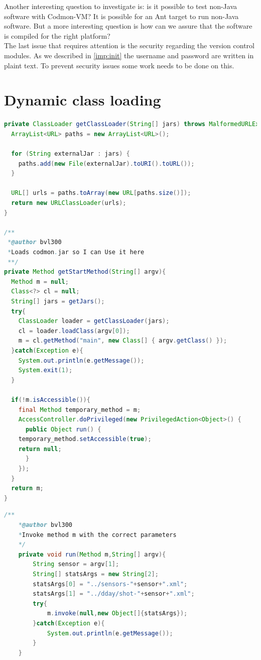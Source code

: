 \documentclass{article}
\newcommand{\project}{Codmon-VM}
\begin{document}
\noindent Another interesting question to investigate is: is it possible to test non-Java software with \project{}? It is possible for an Ant target to run non-Java software. But a more interesting 
question is how can we assure that the software is compiled for the right platform?\\

\noindent The last issue that requires attention is the security regarding the version control modules. As we described in \ref{imp:init} the username and password are written in plaint text. To prevent 
security issues some work needs to be done on this.

\newpage

\newpage
\appendix
\section{Dynamic class loading}
\label{AppendixA}

\begin{lstlisting}[frame=single ,language=Java]
private ClassLoader getClassLoader(String[] jars) throws MalformedURLException, SecurityException{
  ArrayList<URL> paths = new ArrayList<URL>();

  for (String externalJar : jars) {
    paths.add(new File(externalJar).toURI().toURL());
  }
  
  URL[] urls = paths.toArray(new URL[paths.size()]);
  return new URLClassLoader(urls);
}	

/**
 *@author bvl300
 *Loads codmon.jar so I can Use it here
 **/
private Method getStartMethod(String[] argv){	
  Method m = null;
  Class<?> cl = null;
  String[] jars = getJars();
  try{
    ClassLoader loader = getClassLoader(jars);
    cl = loader.loadClass(argv[0]);
    m = cl.getMethod("main", new Class[] { argv.getClass() });
  }catch(Exception e){
    System.out.println(e.getMessage());
    System.exit(1);
  }

  if(!m.isAccessible()){
    final Method temporary_method = m;
    AccessController.doPrivileged(new PrivilegedAction<Object>() {
      public Object run() {
	temporary_method.setAccessible(true);
	return null;
      }
    });
  }
  return m;
} 
\end{lstlisting} 
\newpage
{}
\begin{lstlisting}[frame=single ,language=Java]
	/**
 	*@author bvl300
 	*Invoke method m with the correct parameters
 	*/ 
	private void run(Method m,String[] argv){
		String sensor = argv[1];
		String[] statsArgs = new String[2];
		statsArgs[0] = "../sensors-"+sensor+".xml";
		statsArgs[1] = "../dday/shot-"+sensor+".xml";
		try{
			m.invoke(null,new Object[]{statsArgs});
		}catch(Exception e){
			System.out.println(e.getMessage());
		}
	}
\end{lstlisting}  
\end{document}
